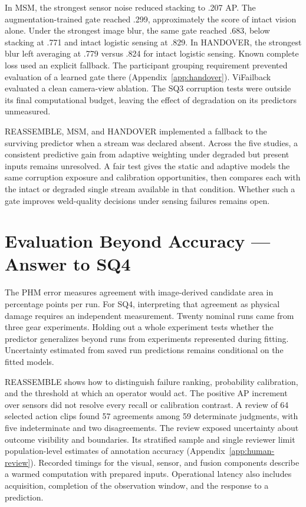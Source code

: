 In MSM, the strongest sensor noise reduced stacking to .207 AP. The augmentation-trained gate reached .299, approximately the score of intact vision alone. Under the strongest image blur, the same gate reached .683, below stacking at .771 and intact logistic sensing at .829. In HANDOVER, the strongest blur left averaging at .779 versus .824 for intact logistic sensing. Known complete loss used an explicit fallback. The participant grouping requirement prevented evaluation of a learned gate there (Appendix~\ref{app:handover}). ViFailback evaluated a clean camera-view ablation. The SQ3 corruption tests were outside its final computational budget, leaving the effect of degradation on its predictors unmeasured.

REASSEMBLE, MSM, and HANDOVER implemented a fallback to the surviving predictor when a stream was declared absent. Across the five studies, a consistent predictive gain from adaptive weighting under degraded but present inputs remains unresolved. A fair test gives the static and adaptive models the same corruption exposure and calibration opportunities, then compares each with the intact or degraded single stream available in that condition. Whether such a gate improves weld-quality decisions under sensing failures remains open.

\section{Evaluation Beyond Accuracy --- Answer to SQ4}
The PHM error measures agreement with image-derived candidate area in percentage points per run. For SQ4, interpreting that agreement as physical damage requires an independent measurement. Twenty nominal runs came from three gear experiments. Holding out a whole experiment tests whether the predictor generalizes beyond runs from experiments represented during fitting. Uncertainty estimated from saved run predictions remains conditional on the fitted models.

REASSEMBLE shows how to distinguish failure ranking, probability calibration, and the threshold at which an operator would act. The positive AP increment over sensors did not resolve every recall or calibration contrast. A review of 64 selected action clips found 57 agreements among 59 determinate judgments, with five indeterminate and two disagreements. The review exposed uncertainty about outcome visibility and boundaries. Its stratified sample and single reviewer limit population-level estimates of annotation accuracy (Appendix~\ref{app:human-review}). Recorded timings for the visual, sensor, and fusion components describe a warmed computation with prepared inputs. Operational latency also includes acquisition, completion of the observation window, and the response to a prediction.

